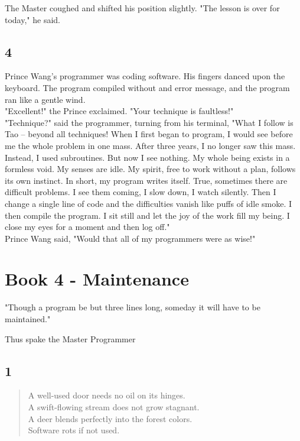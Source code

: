 \documentclass[14pt, letterpaper]{book}
\begin{document}
The Master coughed and shifted his position slightly. "The lesson is over for today," he said.\\

\section*{4}
Prince Wang's programmer was coding software. His fingers danced upon the keyboard. The program compiled without and error message, and the program ran like a gentle wind.\\

"Excellent!" the Prince exclaimed. "Your technique is faultless!"\\

"Technique?" said the programmer, turning from his terminal, "What I follow is Tao -- beyond all techniques! When I first began to program, I would see before me the whole problem in one mass. After three years, I no longer saw this mass. Instead, I used subroutines. But now I see nothing. My whole being exists in a formless void. My senses are idle. My spirit, free to work without a plan, follows its own instinct. In short, my program writes itself. True, sometimes there are difficult problems. I see them coming, I slow down, I watch silently. Then I change a single line of code and the difficulties vanish like puffs of idle smoke. I then compile the program. I sit still and let the joy of the work fill my being. I close my eyes for a moment and then log off."\\

Prince Wang said, "Would that all of my programmers were as wise!"\\

\chapter*{Book 4 - Maintenance}
\epigraph{"Though a program be but three lines long, someday it will have to be maintained."}{Thus spake the Master Programmer}

\section*{1}
\begin{verse}
    A well-used door needs no oil on its hinges. \\
    A swift-flowing stream does not grow stagnant. \\
    A deer blends perfectly into the forest colors. \\
    Software rots if not used.\\
\end{verse}
\end{document}
